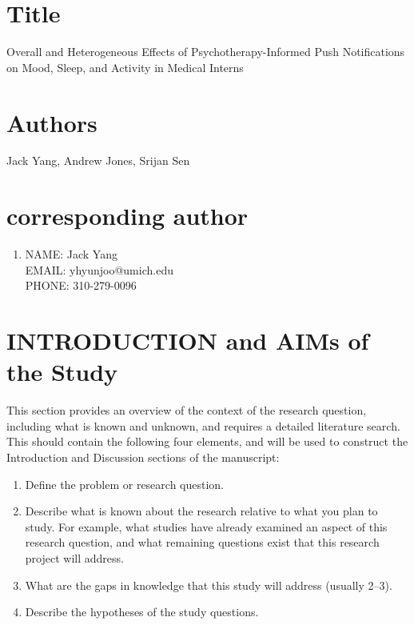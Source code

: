 \documentclass[11pt,letterpaper]{article}
\begin{document}

\section{Title}
Overall and Heterogeneous Effects of Psychotherapy-Informed Push Notifications
on Mood, Sleep, and Activity in Medical Interns

\section{Authors}
Jack Yang, Andrew Jones, Srijan Sen

\section{corresponding author}
\begin{enumerate}
  \item NAME: Jack Yang \\[8pt]
        EMAIL: yhyunjoo@umich.edu \\[8pt]
        PHONE: 310-279-0096
\end{enumerate}

\section{INTRODUCTION and AIMs of the Study}
This section provides an overview of the context of the research question,
including what is known and unknown, and requires a detailed literature
search. This should contain the following four elements, and will be used
to construct the Introduction and Discussion sections of the manuscript:

\begin{enumerate}
  \item Define the problem or research question.
  \item Describe what is known about the research relative to what you plan
        to study. For example, what studies have already examined an aspect
        of this research question, and what remaining questions exist that
        this research project will address.
  \item What are the gaps in knowledge that this study will address
        (usually 2--3).
  \item Describe the hypotheses of the study questions.
\end{enumerate}
\end{document}
